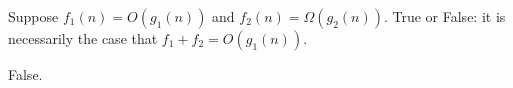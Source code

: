 \begin{prob}
     Suppose $f_1(n) = O(g_1(n))$ and $f_2(n) = \Omega(g_2(n))$. True or False:
     it is necessarily the case that
     $f_1 + f_2 = O(g_1(n))$.

     \tF{}

     \begin{soln}
         False.
     \end{soln}
\end{prob}
